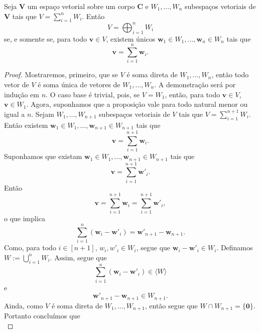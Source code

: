 \begin{proposition}
	Seja $\bm V$ um espaço vetorial sobre um corpo $\bm C$ e $W_1,\ldots,W_n$ subespaços vetoriais de $\bm V$ tais que $V = \sum_{i=1}^n W_i$. Então
	\begin{equation*}
	V=\bigoplus_{i=1}^n W_i
	\end{equation*}
se, e somente se, para todo $\bm v \in V$, existem únicos $\bm w_1 \in W_1,\ldots,\bm w_n \in W_n$ tais que
	\begin{equation*}
	\bm v = \sum_{i=1}^n \bm w_i.
	\end{equation*}
\end{proposition}
\begin{proof}
	Mostraremos, primeiro, que se $V$ é soma direta de $W_1,\ldots,W_n$, então todo vetor de $V$ é soma única de vetores de $W_1,\ldots,W_n$. A demonstração será por indução em $n$. O caso base é trivial, pois, se $V=W_1$, então, para todo $\bm v \in V$, $\bm v \in W_1$. Agora, suponhamos que a proposição vale para todo natural menor ou igual a $n$. Sejam $W_1,\ldots,W_{n+1}$ subespaços vetoriais de $V$ tais que $V = \sum_{i=1}^{n+1} W_i$. Então existem $\bm w_1 \in W_1,\ldots,\bm w_{n+1} \in W_{n+1}$ tais que
	\begin{equation*}
	\bm v = \sum_{i=1}^{n+1} \bm w_i.
	\end{equation*}
Suponhamos que existam $\bm w_1 \in W_1,\ldots,\bm w_{n+1} \in W_{n+1}$ tais que
	\begin{equation*}
	\bm v = \sum_{i=1}^{n+1} \bm w'_i.
	\end{equation*}
Então
	\begin{equation*}
	\bm v = \sum_{i=1}^{n+1} \bm w_i = \sum_{i=1}^{n+1} \bm w'_i,
	\end{equation*}
o que implica
	\begin{equation*}
	\sum_{i=1}^n (\bm w_i - \bm w'_i) = \bm w'_{n+1} - \bm w_{n+1}.
	\end{equation*}
Como, para todo $i \in [n+1]$, $w_i,w'_i \in W_i$, segue que $\bm w_i - \bm w'_i \in W_i$. Definamos $W := \bigcup_{i=1}^n W_i$. Assim, segue que
	\begin{equation*}
	\sum_{i=1}^n (\bm w_i - \bm w'_i) \in \langle W \rangle
	\end{equation*}
e
	\begin{equation*}
	\bm w'_{n+1} - \bm w_{n+1} \in W_{n+1}.
	\end{equation*}
Ainda, como $V$ é soma direta de $W_1,\ldots,W_{n+1}$, então segue que $W \cap W_{n+1} = \{\bm 0\}$. Portanto concluímos que
	\begin{equation*}

\end{equation*}
\end{proof}
